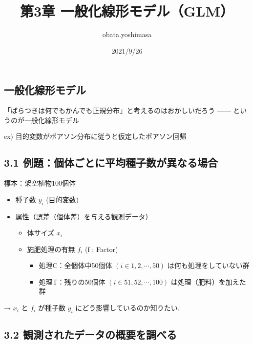 \documentclass[
]{article}
\title{第3章 一般化線形モデル（GLM）}
\author{obata.yoshimasa}
\date{2021/9/26}
\providecommand{\tightlist}{%
  \setlength{\itemsep}{0pt}\setlength{\parskip}{0pt}}
\begin{document}
\maketitle

\hypertarget{ux4e00ux822cux5316ux7ddaux5f62ux30e2ux30c7ux30eb}{%
\subsection{一般化線形モデル}\label{ux4e00ux822cux5316ux7ddaux5f62ux30e2ux30c7ux30eb}}

「ばらつきは何でもかんでも正規分布」と考えるのはおかしいだろう ------
というのが一般化線形モデル

ex) 目的変数がポアソン分布に従うと仮定したポアソン回帰

\hypertarget{ux4f8bux984cux500bux4f53ux3054ux3068ux306bux5e73ux5747ux7a2eux5b50ux6570ux304cux7570ux306aux308bux5834ux5408}{%
\subsection{3.1
例題：個体ごとに平均種子数が異なる場合}\label{ux4f8bux984cux500bux4f53ux3054ux3068ux306bux5e73ux5747ux7a2eux5b50ux6570ux304cux7570ux306aux308bux5834ux5408}}

標本：架空植物100個体

\begin{itemize}
\tightlist
\item
  種子数 \(y_i\) (目的変数)
\item
  属性（誤差（個体差）を与える観測データ）

  \begin{itemize}
  \tightlist
  \item
    体サイズ \(x_i\)
  \item
    施肥処理の有無 \(f_i\) (f : Factor)

    \begin{itemize}
    \tightlist
    \item
      処理C：全個体中50個体 \((i \in {1, 2, \cdots, 50})\)
      は何も処理をしていない群
    \item
      処理T：残りの50個体 \((i \in {51, 52, \cdots, 100})\)
      は処理（肥料）を加えた群
    \end{itemize}
  \end{itemize}
\end{itemize}

→ \(x_i\) と \(f_i\) が種子数 \(y_i\) にどう影響しているのか知りたい.

\hypertarget{ux89b3ux6e2cux3055ux308cux305fux30c7ux30fcux30bfux306eux6982ux8981ux3092ux8abfux3079ux308b}{%
\subsection{3.2
観測されたデータの概要を調べる}\label{ux89b3ux6e2cux3055ux308cux305fux30c7ux30fcux30bfux306eux6982ux8981ux3092ux8abfux3079ux308b}}
\end{document}
